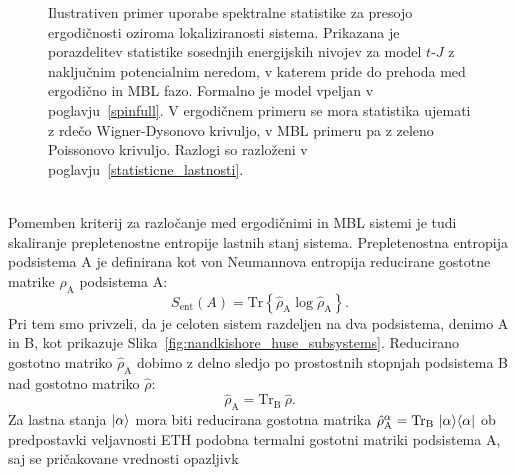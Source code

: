 \begin{figure}[H]
\caption{Ilustrativen primer uporabe spektralne statistike za presojo ergodičnosti oziroma lokaliziranosti sistema. Prikazana je porazdelitev statistike sosednjih energijskih nivojev za model $t$-$J$ z naključnim potencialnim neredom, v katerem pride do prehoda med ergodično in MBL fazo. Formalno je model vpeljan v poglavju~\ref{spinfull}. V ergodičnem primeru se mora statistika ujemati z rdečo Wigner-Dysonovo krivuljo, v MBL primeru pa z zeleno Poissonovo krivuljo. Razlogi so razloženi v poglavju~\ref{statisticne_lastnosti}.
}
\label{fig:unfolding_demo}
\end{figure}
\noindent
\begin{minipage}[t]{0.65\textwidth}
\noindent \\
Pomemben kriterij za razločanje med ergodičnimi in MBL sistemi je tudi skaliranje prepletenostne entropije lastnih stanj sistema. Prepletenostna entropija podsistema A je definirana kot von Neumannova entropija reducirane gostotne matrike $\hat{\rho}_\mathrm{A}$ podsistema A: 
\begin{equation}\label{eq:entanglement}
S_\mathrm{ent}\left(A\right)=\mathrm{Tr}\left\{ \hat{\rho}_\mathrm{A}\log \hat{\rho}_\mathrm{A}\right\}.
\end{equation}
Pri tem smo privzeli, da je celoten sistem razdeljen na dva podsistema, denimo A in B, kot prikazuje Slika~\ref{fig:nandkishore_huse_subsystems}. Reducirano gostotno matriko $\hat{\rho}_\mathrm{A}$ dobimo z delno sledjo  po prostostnih stopnjah podsistema B nad gostotno matriko $\hat{\rho}$:
\begin{equation}
\hat{\rho}_\mathrm{A}=\mathrm{Tr}_\mathrm{B}\	 \hat{\rho}.
\end{equation}
Za lastna stanja $\vert\alpha\rangle$ mora biti reducirana gostotna matrika $\hat{\rho}_\mathrm{A}^\alpha=\mathrm{Tr}_\mathrm{B}\ \ket{\alpha}\bra{\alpha}$ ob predpostavki veljavnosti ETH podobna termalni gostotni matriki podsistema A, saj se pričakovane vrednosti opazljivk
\end{minipage}\hfill
